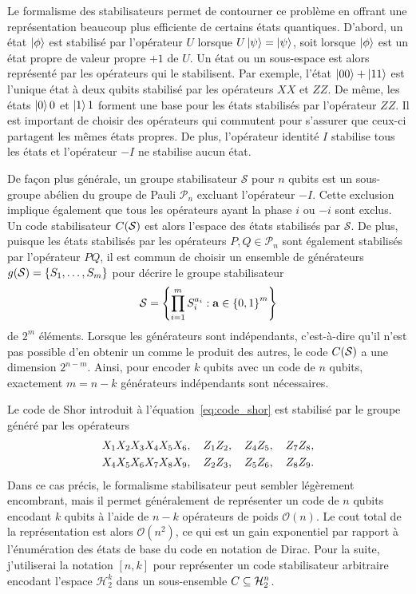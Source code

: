 Le formalisme des stabilisateurs permet de contourner ce problème en offrant une 
représentation beaucoup plus efficiente de certains états quantiques.
D'abord,
un état $\ket\phi$ est stabilisé par l'opérateur $U$ lorsque $U\ket\psi = \ket\psi$,
soit lorsque $\ket \phi$ est un état propre de valeur propre $+1$ de $U$.
Un état ou un sous-espace est alors représenté par les opérateurs qui le stabilisent.
Par exemple,
l'état $\ket{00} + \ket{11}$ est l'unique état à deux qubits stabilisé par 
les opérateurs $XX$ et $ZZ$. 
De même,
les états $\ket 00$ et $\ket 11$ forment une base
pour les états stabilisés par l'opérateur $ZZ$.
Il est important de choisir des opérateurs qui commutent pour s'assurer 
que ceux-ci partagent les mêmes états propres.
De plus, l'opérateur identité $I$ stabilise tous les états
et l'opérateur $-I$ ne stabilise aucun état.

De façon plus générale,
un groupe stabilisateur $\mathcal S$ pour $n$ qubits est un sous-groupe abélien 
du groupe de Pauli $\mathcal P_n$ excluant l'opérateur $-I$.
Cette exclusion implique également que tous les opérateurs ayant la phase $i$ ou $-i$ sont exclus.
Un code stabilisateur $C(\mathcal S)$ est alors l'espace des états stabilisés par $\mathcal S$.
De plus,
puisque les états stabilisés par les opérateurs $P, Q \in \mathcal P_n$ sont également
stabilisés par l'opérateur $PQ$,
il est commun de choisir un ensemble de générateurs $g(\mathcal S) = \qty{S_1, \ldots, S_m}$
pour décrire le groupe stabilisateur
\begin{align}
  \mathcal S = 
  \qty{
    \prod_{i=1}^m S_i^{a_i} : \vb a \in \qty{0, 1}^m
  }
\end{align}
de $2^m$ éléments.
Lorsque les générateurs sont indépendants,
c'est-à-dire qu'il n'est pas possible d'en obtenir un comme le produit des autres,
le code $C(\mathcal S)$ a une dimension $2^{n - m}$.
Ainsi, 
pour encoder $k$ qubits avec un code de $n$ qubits,
exactement $m = n - k$ générateurs indépendants sont nécessaires.

Le code de Shor introduit à l'équation~\eqref{eq:code_shor} est stabilisé
par le groupe généré par les opérateurs 
\begin{gather}
    X_1 X_2 X_3 X_4 X_5 X_6, \quad
    Z_1 Z_2, \quad Z_4 Z_5, \quad Z_7 Z_8, \notag \\
    X_4 X_5 X_6 X_7 X_8 X_9, \quad
    Z_2 Z_3, \quad Z_5 Z_6, \quad Z_8 Z_9.
\end{gather}
Dans ce cas précis,
le formalisme stabilisateur peut sembler légèrement encombrant,
mais il permet généralement de représenter un code de $n$ qubits encodant $k$ qubits
à l'aide de $n - k$ opérateurs de poids $\mathcal O(n)$.
Le cout total de la représentation est alors $\mathcal O(n^2)$, ce qui est un gain exponentiel
par rapport à l'énumération des états de base du code en notation de Dirac.
Pour la suite,
j'utiliserai la notation $[n, k]$ pour représenter un code stabilisateur arbitraire 
encodant l'espace $\mathcal H_2^k$ dans un sous-ensemble $C \subseteq \mathcal H_2^n$.

